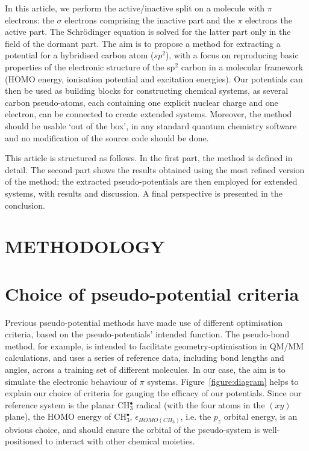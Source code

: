 \documentclass[12pt]{article}
\begin{document}
In this article, we perform the active/inactive split on a molecule with $\pi$ electrons: the $\sigma$ electrons comprising the inactive part and the $\pi$ electrons the active part.
The Schr\"odinger equation is solved for the latter part only in the field of the dormant part.
The aim is to propose a method for extracting a potential for a hybridised carbon atom 
($sp^2$), with a focus on reproducing basic properties of the electronic structure of the sp$^2$ carbon in a molecular framework 
(HOMO energy, ionisation potential and excitation energies).
Our potentials can then be used as 
building blocks for constructing chemical systems, as several carbon pseudo-atoms,
each containing one explicit nuclear charge and one electron, can be connected to create extended
systems.
Moreover, the method should be usable `out of the box', in any standard quantum chemistry software
and no modification of the source code should be done.

This article is structured as follows.
In the first part, the method is defined in detail.
The second part shows the results obtained using the most refined version of the method; the extracted pseudo-potentials are then employed for extended systems, with results and discussion. A final perspective is presented in the conclusion.

\section*{\sffamily \Large METHODOLOGY}

\section*{\sffamily \large Choice of pseudo-potential criteria \label{section:pseudocrit}} 

Previous pseudo-potential methods have made use of different optimisation criteria, based on the pseudo-potentials' intended function. 
The pseudo-bond method, for example, is intended to facilitate geometry-optimisation in QM/MM calculations, and uses a series of reference data, 
including bond lengths and angles, across a training set of different molecules.\cite{zhang_pseudobond_1998}
In our case, the aim is to simulate the electronic behaviour of $\pi$ systems.
Figure~\ref{figure:diagram} helps to explain our choice of criteria for gauging the efficacy of our potentials. Since our reference system is the planar CH$_3^\bullet$ radical (with the four atoms in the $(xy)$ plane), the HOMO energy of CH$_3^{\bullet}$, $\epsilon_{HOMO(CH_3)}$, i.e. the $p_{z}$ orbital energy, is an obvious choice, and should ensure the orbital of the pseudo-system is well-positioned to interact with other chemical moieties.
\end{document}
